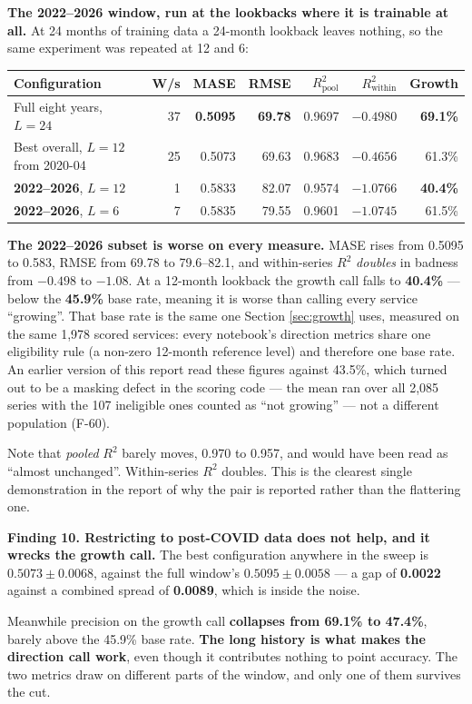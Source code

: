 \documentclass[11pt,a4paper]{article}
\newcommand{\keypoint}[1]{%
  \par\vspace{0.4em}%
  \noindent\colorbox{fed!8}{\parbox{0.98\textwidth}{\vspace{0.2em}#1\vspace{0.2em}}}%
  \par\vspace{0.4em}}
\begin{document}
\textbf{The 2022--2026 window, run at the lookbacks where it is trainable at all.} At 24 months of
training data a 24-month lookback leaves nothing, so the same experiment was repeated at 12 and 6:

\begin{center}
\scriptsize
\begin{tabular}{@{}lrrrrrr@{}}
\toprule
\textbf{Configuration} & \textbf{W/s} & \textbf{MASE} & \textbf{RMSE} & \textbf{$R^2_{\text{pool}}$} & \textbf{$R^2_{\text{within}}$} & \textbf{Growth} \\
\midrule
Full eight years, $L=24$ & 37 & \textbf{0.5095} & \textbf{69.78} & 0.9697 & $\mathbf{-0.4980}$ & \textbf{69.1\%} \\
Best overall, $L=12$ from 2020-04 & 25 & 0.5073 & 69.63 & 0.9683 & $-0.4656$ & 61.3\% \\
\midrule
\textbf{2022--2026}, $L=12$ & 1 & 0.5833 & 82.07 & 0.9574 & $-1.0766$ & \textbf{40.4\%} \\
\textbf{2022--2026}, $L=6$ & 7 & 0.5835 & 79.55 & 0.9601 & $-1.0745$ & 61.5\% \\
\bottomrule
\end{tabular}
\end{center}

\keypoint{\textbf{The 2022--2026 subset is worse on every measure.} MASE rises from 0.5095 to 0.583,
RMSE from 69.78 to 79.6--82.1, and within-series $R^2$ \emph{doubles} in badness from $-0.498$ to
$-1.08$. At a 12-month lookback the growth call falls to \textbf{40.4\%} --- below the \textbf{45.9\%}
base rate, meaning it is worse than calling every service ``growing''. That base rate is the same one
Section \ref{sec:growth} uses, measured on the same 1{,}978 scored services: every notebook's direction
metrics share one eligibility rule (a non-zero 12-month reference level) and therefore one base rate.
An earlier version of this report read these figures against 43.5\%, which turned out to be a masking
defect in the scoring code --- the mean ran over all 2{,}085 series with the 107 ineligible ones
counted as ``not growing'' --- not a different population (F-60).

Note that \emph{pooled} $R^2$ barely moves, 0.970 to 0.957, and would have been read as ``almost
unchanged''. Within-series $R^2$ doubles. This is the clearest single demonstration in the report of
why the pair is reported rather than the flattering one.}

\keypoint{\textbf{Finding 10. Restricting to post-COVID data does not help, and it wrecks the growth
call.} The best configuration anywhere in the sweep is $0.5073 \pm 0.0068$, against the full window's
$0.5095 \pm 0.0058$ --- a gap of \textbf{0.0022} against a combined spread of \textbf{0.0089}, which is
inside the noise.

Meanwhile precision on the growth call \textbf{collapses from 69.1\% to 47.4\%}, barely above the
45.9\% base rate. \textbf{The long history is what makes the direction call work}, even though it
contributes nothing to point accuracy. The two metrics draw on different parts of the window, and only
one of them survives the cut.}
\end{document}
